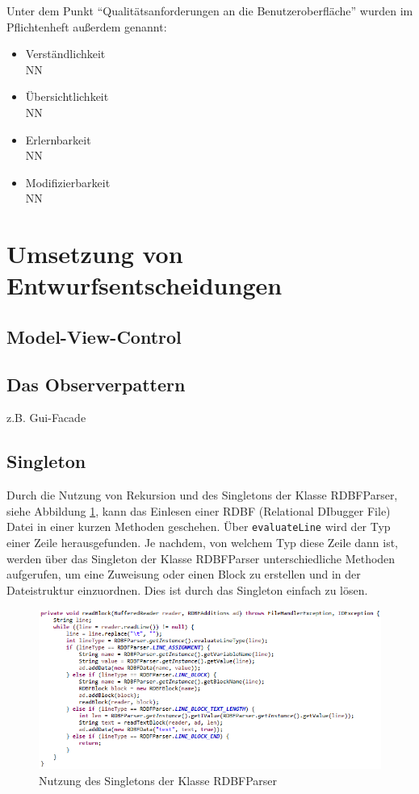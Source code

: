 \documentclass[parskip=full]{scrartcl}
\begin{document}
				Unter dem Punkt \enquote{Qualitätsanforderungen an die Benutzeroberfläche} wurden im Pflichtenheft außerdem genannt:
				\begin{itemize}
				\item Verständlichkeit \\
				NN
				\item Übersichtlichkeit \\
				NN
				\item Erlernbarkeit \\
				NN
				\item Modifizierbarkeit \\
				NN
				
				\end{itemize}
		
\section{Umsetzung von Entwurfsentscheidungen}
\subsection{Model-View-Control}
\subsection{Das Observerpattern}
z.B. Gui-Facade
\newpage
\subsection{Singleton}
Durch die Nutzung von Rekursion und des Singletons der Klasse RDBFParser, siehe Abbildung \ref{loadRDBF}, kann das Einlesen einer RDBF (Relational DIbugger File) Datei in einer kurzen Methoden geschehen.
Über \texttt{evaluateLine} wird der Typ einer Zeile herausgefunden. Je nachdem, von welchem Typ diese Zeile dann ist, werden über das Singleton der Klasse RDBFParser unterschiedliche Methoden aufgerufen, um eine Zuweisung oder einen Block zu erstellen und in der Dateistruktur einzuordnen. Dies ist durch das Singleton einfach zu lösen.
\begin{figure}[!h]
\includegraphics[width=1.0\textwidth]{document_data/loadRDBFFile.png}
\caption{Nutzung des Singletons der Klasse RDBFParser}
\label{loadRDBF}
\end{figure}
\end{document}
